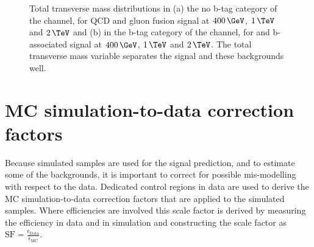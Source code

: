 \begin{figure}[h!]
\begin{center}
\end{center}
\caption[Total transverse mass distributions in the no b-tag category of the
\tautau channel for QCD and gluon fusion signal, and in the b-tag category
of the \emu channel, for \ttbar and b-associated signal.]{Total transverse mass distributions in (a) the no b-tag category of the \tautau
channel, for QCD and gluon fusion signal at $400\,\GeV$, $1\,\TeV$ and $2\,\TeV$ and (b) in the b-tag
category of the \emu channel, for \ttbar and b-associated signal at $400\,\GeV$, $1\,\TeV$ and $2\,\TeV$. 
The total transverse mass variable separates the signal and these backgrounds well.}
\label{fig:mttot_sigseps}
\end{figure}



\section{\acl{MC} simulation-to-data correction factors}
\label{sec:mssm_mccorrs}
Because simulated samples are used for the signal prediction, and 
to estimate some of the backgrounds, it is important to correct for possible 
mis-modelling with respect to the data. Dedicated control regions in
data are used to derive the \ac{MC} simulation-to-data correction factors
that are applied to the simulated samples. Where efficiencies
are involved this scale factor is derived by measuring the efficiency
in data and in simulation and constructing the scale factor as $\text{SF}=\frac{\epsilon_{\text{Data}}}{\epsilon_{\text{MC}}}$.
